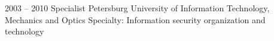 

\begin{entrylist}
    \entry
    {2003 -- 2010}
    {Specialist}
    {Petersburg University of Information Technology, Mechanics and Optics}
    {Specialty: Information security organization and technology}
\end{entrylist}
